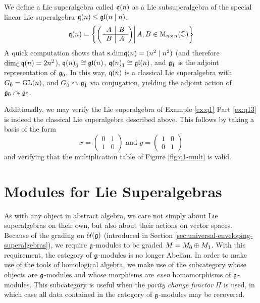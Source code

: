\begin{example} \label{ex:q(n)}
  We define a Lie superalgebra called $\mathfrak{q}(n)$ as a Lie subsuperalgebra of the special linear Lie superalgebra $\mathfrak{q} (n) \leq \mathfrak{gl}(n \mid n)$.
  \[
    \mathfrak{q}(n) =
    \left\{
    \left(
    \left.    
      \begin{array}{c|c}
        A & B \\
        \hline
        B & A
      \end{array}
    \right)
    \right| A,B \in \operatorname{M}_{n \times n}(\mathbb{C})
    \right\}
  \]
  A quick computation shows that $\text{s.dim} \mathfrak{q}(n) = (n^2 \mid n^2)$ (and therefore $\dim_{\mathbb{C}} \mathfrak{q}(n) = 2n^2$), ${\mathfrak{q}(n)}_{\bar{0}} \cong \mathfrak{gl}(n)$, ${\mathfrak{q}(n)}_{\bar{1}} \cong \mathfrak{gl}(n)$, and ${\mathfrak{g}}_{\bar{1}}$ is the adjoint representation of ${\mathfrak{g}}_{\bar{0}}$. In this way, $\mathfrak{q}(n)$ is a classical Lie superalgebra with ${G}_{\bar{0}} = \operatorname{GL}(n)$, and ${G}_{\bar{0}} \curvearrowright {\mathfrak{g}}_{\bar{1}}$ via conjugation, yielding the adjoint action of ${\mathfrak{g}}_{\bar{0}} \curvearrowright {\mathfrak{g}}_{\bar{1}}$.

  Additionally, we may verify the Lie superalgebra of Example \ref{ex:q1} Part \ref{ex:q13} is indeed the classical Lie superalgebra described above. This follows by taking a basis of the form
  \[
    x = 
        \left(
      \begin{array}{c|c}
        0 & 1 \\
        \hline
        1 & 0
      \end{array}
    \right)
    \text{ and }
    y = 
        \left(
      \begin{array}{c|c}
        1 & 0 \\
        \hline
        0 & 1
      \end{array}
    \right)
  \]
  and verifying that the multiplication table of Figure \ref{fig:q1-mult} is valid.
\end{example}


\section{Modules for Lie Superalgebras}
\label{sec:modules}

As with any object in abstract algebra, we care not simply about Lie superalgebras on their own, but also about their actions on vector spaces. Because of the grading on $\mathcal{U}(\mathfrak{g})$ (introduced in Section \ref{sec:universal-enveloping-superalgebras}), we require $\mathfrak{g}$-modules to be graded $M = {M}_{\bar{0}} \oplus {M}_{\bar{1}}$. With this requirement, the category of $\mathfrak{g}$-modules is no longer Abelian. In order to make use of the tools of homological algebra, we make use of the subcategory whose objects are $\mathfrak{g}$-modules and whose morphisms are \emph{even} homomorphisms of $\mathfrak{g}$-modules. This subcategory is useful when the \emph{parity change functor} $\Pi$ is used, in which case all data contained in the catogory of $\mathfrak{g}$-modules may be recovered.

